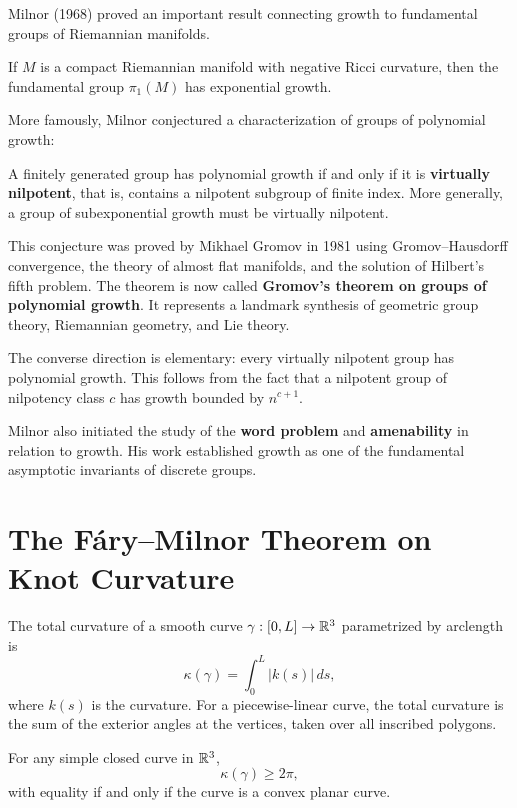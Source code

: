 Milnor (1968) proved an important result connecting growth to fundamental groups of Riemannian manifolds.

\begin{theorem}[Milnor, 1968]
If \(M\) is a compact Riemannian manifold with negative Ricci curvature, then the fundamental group \(\pi_1(M)\) has exponential growth.
\end{theorem}

More famously, Milnor conjectured a characterization of groups of polynomial growth:

\begin{condition}
A finitely generated group has polynomial growth if and only if it is \textbf{virtually nilpotent}, that is, contains a nilpotent subgroup of finite index. More generally, a group of subexponential growth must be virtually nilpotent.
\end{condition}

This conjecture was proved by Mikhael Gromov in 1981 using Gromov--Hausdorff convergence, the theory of almost flat manifolds, and the solution of Hilbert's fifth problem. The theorem is now called \textbf{Gromov's theorem on groups of polynomial growth}. It represents a landmark synthesis of geometric group theory, Riemannian geometry, and Lie theory.

The converse direction is elementary: every virtually nilpotent group has polynomial growth. This follows from the fact that a nilpotent group of nilpotency class \(c\) has growth bounded by \(n^{c+1}\).

Milnor also initiated the study of the \textbf{word problem} and \textbf{amenability} in relation to growth. His work established growth as one of the fundamental asymptotic invariants of discrete groups.

\section{The F\'ary--Milnor Theorem on Knot Curvature}

The total curvature of a smooth curve \(\gamma: [0,L] \to \mathbb{R}^3\) parametrized by arclength is
\[
\kappa(\gamma) = \int_0^L |k(s)|\,ds,
\]
where \(k(s)\) is the curvature. For a piecewise-linear curve, the total curvature is the sum of the exterior angles at the vertices, taken over all inscribed polygons.

\begin{theorem}
For any simple closed curve in \(\mathbb{R}^3\),
\[
\kappa(\gamma) \geq 2\pi,
\]
with equality if and only if the curve is a convex planar curve.
\end{theorem}

